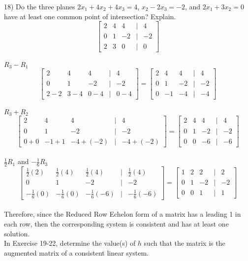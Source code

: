 \documentclass[]{article}
\begin{document}
18) Do the three planes $2x_1+4x_2+4x_3=4$, $x_2-2x_3=-2$, and $2x_1+3x_2=0$ have at least one common point of intersection? Explain.\\
\[
\begin{bmatrix}
	2&4&4&|&4\\
	0&1&-2&|&-2\\
	2&3&0&|&0
\end{bmatrix}	
\]\\
$R_3-R_1$
\[
\begin{bmatrix}
	2&4&4&|&4\\
	0&1&-2&|&-2\\
	2-2&3-4&0-4&|&0-4
\end{bmatrix}=
\begin{bmatrix}
	2&4&4&|&4\\
	0&1&-2&|&-2\\
	0&-1&-4&|&-4
\end{bmatrix}
\]\\
$R_3+R_2$
\[
\begin{bmatrix}
	2&4&4&|&4\\
	0&1&-2&|&-2\\
	0+0&-1+1&-4+(-2)&|&-4+(-2)
\end{bmatrix}=
\begin{bmatrix}
	2&4&4&|&4\\
	0&1&-2&|&-2\\
	0&0&-6&|&-6
\end{bmatrix}
\]\\
$\frac{1}{2}R_1$ and $-\frac{1}{6}R_3$
\[
\begin{bmatrix}
	\frac{1}{2}(2)&\frac{1}{2}(4)&\frac{1}{2}(4)&|&\frac{1}{2}(4)\\
	0&1&-2&|&-2\\
	-\frac{1}{6}(0)&-\frac{1}{6}(0)&-\frac{1}{6}(-6)&|&-\frac{1}{6}(-6)
\end{bmatrix}=
\begin{bmatrix}
	1&2&2&|&2\\
	0&1&-2&|&-2\\
	0&0&1&|&1
\end{bmatrix}
\]\\
Therefore, since the Reduced Row Echelon form of a matrix has a leading 1 in each row, then the corresponding system is consistent and has at least one solution.\\

In Exercise 19-22, determine the value(s) of $h$ such that the matrix is the augmented matrix of a consistent linear system.\\
\end{document}
